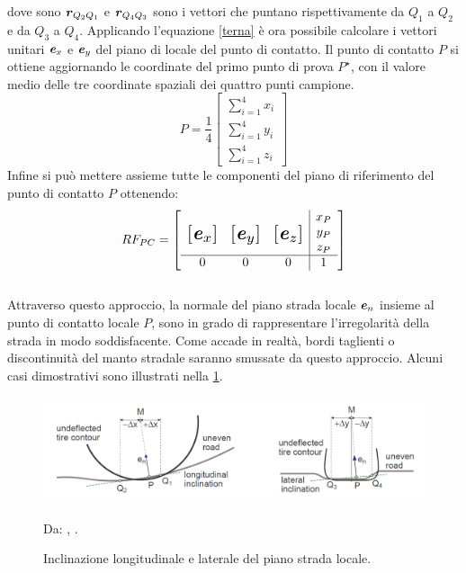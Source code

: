 %
dove sono $\textbf{\textit{r}}_{Q_2 Q_1}$ e $\textbf{\textit{r}}_{Q_4 Q_3}$ sono i vettori che puntano rispettivamente da $Q_1$ a $Q_2$ e da $Q_3$ a $Q_4$. Applicando l'equazione \ref{terna} è ora possibile calcolare i vettori unitari $\textbf{\textit{e}}_{x}$ e $\textbf{\textit{e}}_{y}$ del piano di locale del punto di contatto. Il punto di contatto $P$ si ottiene aggiornando le coordinate del primo punto di prova $P^\star$, con il valore medio delle tre coordinate spaziali dei quattro punti campione.
%
\begin{equation}
P = \frac{1}{4}\begin{bmatrix}
\sum_{i=1}^{4} x_i \\
\sum_{i=1}^{4} y_i \\
\sum_{i=1}^{4} z_i
\end{bmatrix}
\end{equation}
%
Infine si può mettere assieme tutte le componenti del piano di riferimento del punto di contatto $P$ ottenendo:
%
\begin{equation}
RF_{PC} = \left[
\begin{array}{ccc|c}
& & & x_P\\
\multirow{3}{*}{\raisebox{20mm}{\scalebox{1.5}{$\left[\textbf{\textit{e}}_x\right]$}}} & \multirow{3}{*}{\raisebox{20mm}{\scalebox{1.5}{$\left[\textbf{\textit{e}}_y\right]$}}} & \multirow{3}{*}{\raisebox{20mm}{\scalebox{1.5}{$\left[\textbf{\textit{e}}_z\right]$}}} & y_P\\
& & & z_P\\ \hline
0 & 0 & 0 & 1
\end{array}\right]
\end{equation}\\
Attraverso questo approccio, la normale del piano strada locale $\textbf{\textit{e}}_{n}$ insieme al punto di contatto locale $P$, sono in grado di rappresentare l'irregolarità della strada in modo soddisfacente. Come accade in realtà, bordi taglienti o discontinuità del manto stradale saranno smussate da questo approccio. Alcuni casi dimostrativi sono illustrati nella \figurename{  \ref{localplane}}.

\begin{figure}[h]
	\centering
	\includegraphics[width=\linewidth]{Figures/local_plane}
	\caption{Inclinazione longitudinale e laterale del piano strada locale.}
	Da: \citeauthor{Rill}, .
	\label{localplane}
\end{figure}